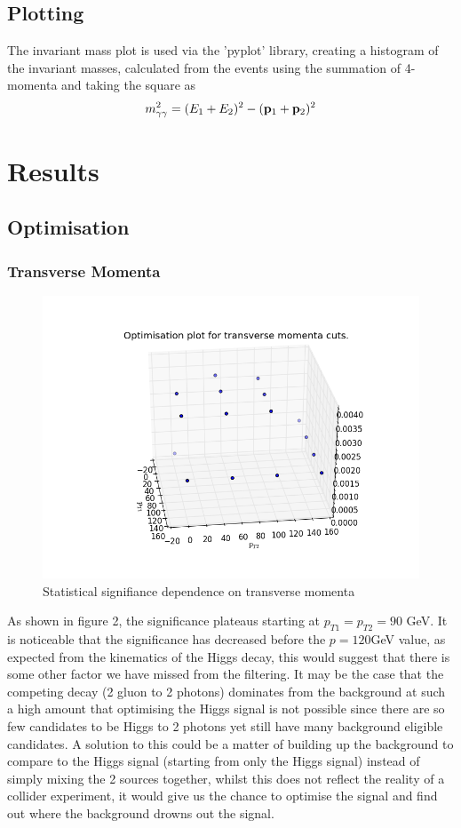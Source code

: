 \documentclass{article}
\begin{document}
\subsection{Plotting}
The invariant mass plot is used via the 'pyplot' library, creating a histogram of the invariant masses, calculated from the events using the summation of 4-momenta and taking the square as
\begin{equation}
m_{\gamma \gamma}^2 = (E_1 + E_2)^2 - ({\bf p}_1  + {\bf p}_2)^2
\end{equation}
\section{Results}
\subsection{Optimisation}
\subsubsection{Transverse Momenta}
\begin{figure}
\includegraphics[scale=0.5]{transverse6}
\caption{Statistical signifiance dependence on transverse momenta}
\end{figure}

As shown in figure 2, the significance plateaus starting at $p_{T1} = p_{T2} = 90$ GeV. It is noticeable that the significance has decreased before the $p = 120$GeV value, as expected from the kinematics of the Higgs decay, this would suggest that there is some other factor we have missed from the filtering. It may be the case that the competing decay (2 gluon to 2 photons) dominates from the background at such a high amount that optimising the Higgs signal is not possible since there are so few candidates to be Higgs to 2 photons yet still have many background eligible candidates. A solution to this could be a matter of building up the background to compare to the Higgs signal (starting from only the Higgs signal) instead of simply mixing the 2 sources together, whilst this does not reflect the reality of a collider experiment, it would give us the chance to optimise the signal and find out where the background drowns out the signal.
\end{document}
